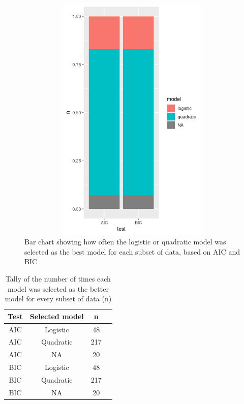 \documentclass{article}[11pt]
\begin{document}
\begin{flushleft}
\begin{figure}[h]
	\includegraphics[width=12cm,height=12cm,keepaspectratio]{best_model.png}
	\centering
	\caption{Bar chart showing how often the logistic or quadratic model was selected as the best model for each subset of data, based on AIC and BIC}
\end{figure}

\begin{table}
	\centering
	\begin{tabular}{||c c c c||} 
		\hline
		Test & Selected model & n & \\ [0.5ex] 
		\hline\hline
		AIC & Logistic & 48 & \\ 
		\hline
		AIC & Quadratic & 217 &\\
		\hline
		AIC & NA & 20 & \\
		\hline
		BIC & Logistic & 48& \\
		\hline
		BIC & Quadratic & 217 & \\ [1ex] 
		\hline
		BIC & NA & 20 & \\ [1ex] 
		\hline
	\end{tabular}
	\caption{Tally of the number of times each model was selected as the better model for every subset of data (n) \label{long}}
\end{table}
\clearpage


\end{flushleft}
\end{document}
